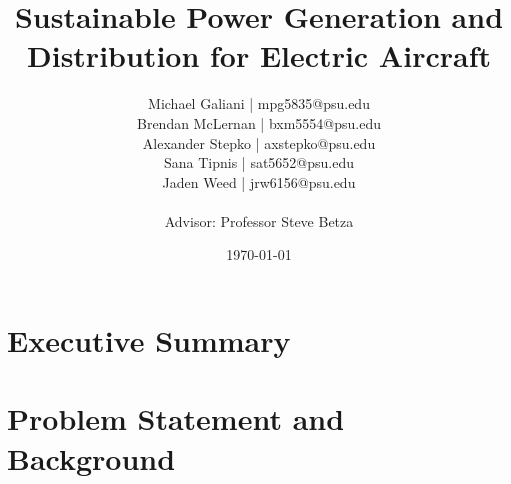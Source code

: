 \documentclass{article}
\title{Sustainable Power Generation and Distribution for Electric Aircraft}
\author{
Michael Galiani | mpg5835@psu.edu\\
Brendan McLernan | bxm5554@psu.edu\\
Alexander Stepko | axstepko@psu.edu\\
Sana Tipnis | sat5652@psu.edu\\
Jaden Weed | jrw6156@psu.edu\\~\\
Advisor: Professor Steve Betza
}
\affil{The Pennsylvania State University}
\date{\today}
\begin{document}
\begin{titlepage}
\maketitle                   %
\end{titlepage}

\tableofcontents
\newpage

\section{Executive Summary}\label{execSum}
\blindtext

\newpage
\section{Problem Statement and Background}\label{probStatement}
\end{document}

